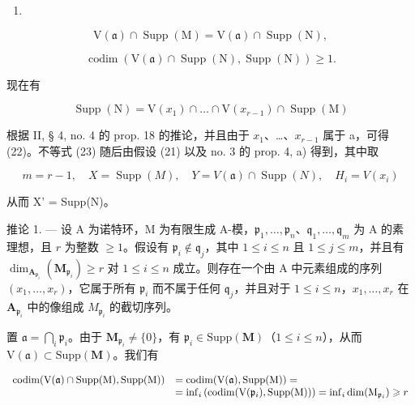 \begin{enumerate}
\def\labelenumi{(\arabic{enumi})}
\setcounter{enumi}{21}
\tightlist
\item
\end{enumerate}

\[
\mathrm{V} (\mathfrak {a}) \cap \operatorname{Supp} (\mathrm{M}) = \mathrm{V} (\mathfrak {a}) \cap \operatorname{Supp} (\mathrm{N}),\tag{23}
\]

\[
\operatorname{codim} (\mathrm{V} (\mathfrak {a}) \cap \operatorname{Supp} (\mathrm{N}), \operatorname{Supp} (\mathrm{N})) \geqslant 1.
\]

现在有

\[
\operatorname{Supp} (\mathrm{N}) = \mathrm{V} (x _ {1}) \cap \dots \cap \mathrm{V} (x _ {r - 1}) \cap \operatorname{Supp} (\mathrm{M})
\]

根据 II, § 4, no. 4 的 prop. 18 的推论，并且由于 \(x_1\)、\ldots、\(x_{r-1}\) 属于 a，可得 (22)。不等式 (23) 随后由假设 (21) 以及 no. 3 的 prop. 4, a) 得到，其中取

\[
m = r - 1, \quad X = \operatorname{Supp} (M), \quad Y = V (\mathfrak {a}) \cap \operatorname{Supp} (N), \quad H _ {i} = V (x _ {i})
\]

从而 X' = Supp(N)。

推论 1. --- 设 A 为诺特环，M 为有限生成 A-模，\(\mathfrak{p}_1, \ldots, \mathfrak{p}_n\)、\(\mathfrak{q}_1, \ldots, \mathfrak{q}_m\) 为 A 的素理想，且 \(r\) 为整数 \(\geqslant 1\)。假设有 \(\mathfrak{p}_i \notin \mathfrak{q}_j\)，其中 \(1 \leqslant i \leqslant n\) 且 \(1 \leqslant j \leqslant m\)，并且有 \(\dim_{\mathbf{A}_{\mathfrak{p}_i}} (\mathbf{M}_{\mathfrak{p}_i}) \geqslant r\) 对 \(1 \leqslant i \leqslant n\) 成立。则存在一个由 A 中元素组成的序列 \((x_1, \ldots, x_r)\)，它属于所有 \(\mathfrak{p}_i\) 而不属于任何 \(\mathfrak{q}_j\)，并且对于 \(1 \leqslant i \leqslant n\)，\(x_1, \ldots, x_r\) 在 \(\mathbf{A}_{\mathfrak{p}_i}\) 中的像组成 \(M_{\mathfrak{p}_i}\) 的截切序列。

置 \(\mathfrak{a} = \bigcap_{i}\mathfrak{p}_{i}\)。由于 \(\mathbf{M}_{\mathfrak{p}_i}\neq \{0\}\)，有 \(\mathfrak{p}_i\in \mathrm{Supp}(\mathbf{M})\)（\(1\leqslant i\leqslant n\)），从而 \(\mathrm{V}(\mathfrak{a})\subset \mathrm{Supp}(\mathbf{M})\)。我们有

\[
\begin{array}{r l} \operatorname{codim} (\mathrm{V} (\mathfrak {a}) \cap \operatorname{Supp} (\mathrm{M}), \operatorname{Supp} (\mathrm{M})) & = \operatorname{codim} (\mathrm{V} (\mathfrak {a}), \operatorname{Supp} (\mathrm{M})) = \\ & = \inf _ {i} \left(\operatorname{codim} (\mathrm{V} (\mathfrak {p} _ {i}), \operatorname{Supp} (\mathrm{M}))\right) = \inf _ {i} \dim (\mathrm{M} _ {\mathfrak {p} _ {i}}) \geqslant r \end{array}
\]

